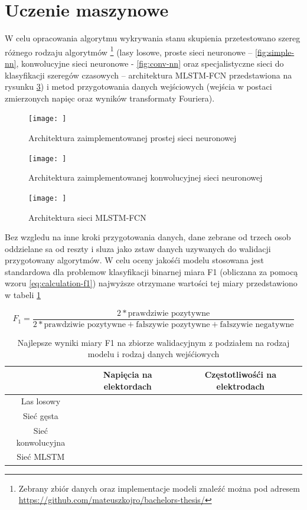 \documentclass{./assets/wfis}
\begin{document}
\section{Uczenie maszynowe}\label{uczenie-maszynowe}
W celu opracowania algorytmu wykrywania stanu skupienia przetestowano szereg różnego rodzaju algorytmów \footnote{Zebrany zbiór danych oraz implementacje modeli znaleźć można pod adresem \url{https://github.com/mateuszkojro/bachelors-thesis/}} (lasy losowe, proste sieci neuronowe – \autoref{fig:simple-nn}, konwolucyjne sieci neuronowe - \autoref{fig:conv-nn} oraz specjalistyczne sieci do klasyfikacji szeregów czasowych – architektura MLSTM-FCN \cite{karim_multivariate_2019} przedstawiona na rysunku \ref{fig:mlstm}) i metod przygotowania danych wejściowych (wejścia w postaci zmierzonych napięc oraz wyników transformaty Fouriera).

\begin{figure}[h!]
    \centering
    \texttt{[image: ]}
    \caption{Architektura zaimplementowanej prostej sieci neuronowej}
    \label{fig:simple-nn}
\end{figure}

\begin{figure}[h!]
    \centering
    \texttt{[image: ]}
    \caption{Architektura zaimplementowanej konwolucyjnej sieci neuronowej}
    \label{fig:conv-nn}
\end{figure}

\begin{figure}[h!]
    \centering
    \texttt{[image: ]}
    \caption{Architektura sieci MLSTM-FCN}
    \label{fig:mlstm}
\end{figure}

Bez wzgledu na inne kroki przygotowania danych, dane zebrane od trzech osob oddzielane sa od reszty i sluza jako zstaw danych uzywanych do walidacji przygotowany algorytmów. W celu oceny jakośći modelu stosowana jest standardowa dla problemow klasyfikacji binarnej miara F1 (obliczana za pomocą wzoru \ref{eq:calculation-f1}) najwyższe otrzymane wartości tej miary przedstawiono w tabeli \ref{tab:high-level-results}

\begin{equation}\label{eq:calculation-f1}
    F_1 = \frac{2*\text{prawdziwie pozytywne}}{2*\text{prawdziwie pozytywne}+\text{fałszywie pozytywne}+\text{fałszywie negatywne}}
\end{equation}


\begin{table}[h]
    \centering
    \begin{tabular}{|c|c|c|}
        \hline
                 & Napięcia na elektordach & Częstotliwośći na elektrodach  \\
        \hline
        Las losowy &  &  \\
        Sieć gęsta &  & \\
        Sieć konwolucyjna & & \\
        Sieć MLSTM & & \\
        \hline
    \end{tabular}
    \caption{Najlepsze wyniki miary F1 na zbiorze walidacyjnym z podziałem na rodzaj modelu i rodzaj danych wejśćiowych}
    \label{tab:high-level-results}
\end{table}
\end{document}
